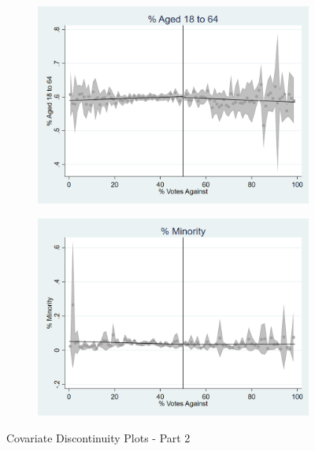 \begin{figure}[ht]
    \vspace{1em}

    \begin{minipage}[b]{0.48\textwidth}
        \centering
        \begin{subfigure}[b]{\textwidth}
            \centering
            \includegraphics[width=\textwidth,keepaspectratio]{images/cov_smoothness_pct18to64.png}
            \label{fig:pct18to64_sm}
        \end{subfigure}
    \end{minipage}
    \hfill
    \begin{minipage}[b]{0.48\textwidth}
        \centering
        \begin{subfigure}[b]{\textwidth}
            \centering
            \includegraphics[width=\textwidth,keepaspectratio]{images/cov_smoothness_pctmin.png}
            \label{fig:pctmin_sm}
        \end{subfigure}
    \end{minipage}        


    \caption{Covariate Discontinuity Plots - Part 2}
    \label{fig:rd_cov_smoothness_2}
\end{figure}


